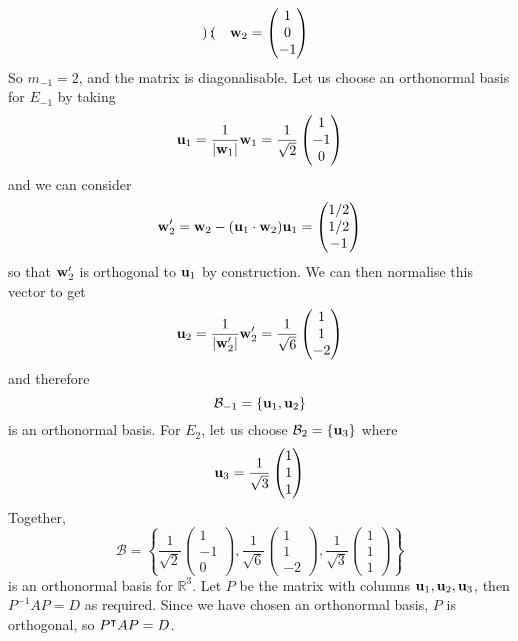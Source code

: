 \begin{enumerate}
\[\begin{pmatrix}
		      \end{pmatrix};\quad \vb w_2 = \begin{pmatrix}
			      1 \\ 0 \\ -1
		      \end{pmatrix}
	      \]
	      So \(m_{-1} = 2\), and the matrix is diagonalisable.
	      Let us choose an orthonormal basis for \(E_{-1}\) by taking
	      \[
		      \vb u_1 = \frac{1}{\abs{\vb w_1}}\vb w_1 = \frac{1}{\sqrt 2}\begin{pmatrix}
			      1 \\ -1 \\ 0
		      \end{pmatrix}
	      \]
	      and we can consider
	      \[
		      \vb w_2' = \vb w_2 - (\vb u_1 \cdot \vb w_2)\vb u_1 = \begin{pmatrix}
			      1/2 \\ 1/2 \\ -1
		      \end{pmatrix}
	      \]
	      so that \(\vb w_2'\) is orthogonal to \(\vb u_1\) by construction.
	      We can then normalise this vector to get
	      \[
		      \vb u_2 = \frac{1}{\abs{\vb w_2'}}\vb w_2' = \frac{1}{\sqrt 6} \begin{pmatrix}
			      1 \\ 1 \\ -2
		      \end{pmatrix}
	      \]
	      and therefore
	      \[
		      \mathcal B_{-1} = \{ \vb u_1, \vb u_2 \}
	      \]
	      is an orthonormal basis.
	      For \(E_2\), let us choose \(\mathcal B_2 = \{ \vb u_3 \}\) where
	      \[
		      \vb u_3 = \frac{1}{\sqrt 3}\begin{pmatrix}
			      1 \\ 1 \\ 1
		      \end{pmatrix}
	      \]
	      Together,
	      \[
		      \mathcal B = \left\{ \frac{1}{\sqrt 2}\begin{pmatrix}
			      1 \\ -1 \\ 0
		      \end{pmatrix}, \frac{1}{\sqrt 6} \begin{pmatrix}
			      1 \\ 1 \\ -2
		      \end{pmatrix}, \frac{1}{\sqrt 3}\begin{pmatrix}
			      1 \\ 1 \\ 1
		      \end{pmatrix} \right\}
	      \]
	      is an orthonormal basis for \(\mathbb R^3\).
	      Let \(P\) be the matrix with columns \(\vb u_1, \vb u_2, \vb u_3\), then \(P^{-1}AP = D\) as required.
	      Since we have chosen an orthonormal basis, \(P\) is orthogonal, so \(P^\intercal AP = D\).
\end{enumerate}


